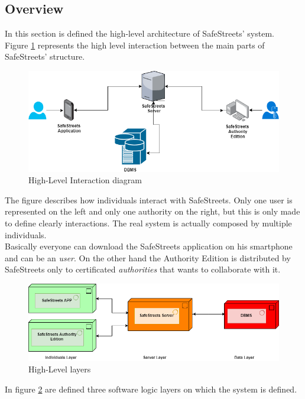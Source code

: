 \documentclass{article}
\begin{document}
		\subsection{Overview}
		In this section is defined the high-level architecture of SafeStreets' system. \\ 
		Figure \ref{fig:hinteraction_diagram} represents the high level interaction between the main parts of SafeStreets' structure.
		\begin{figure}[H]
			\includegraphics [scale=0.5] {diagrams/high-interaction.png}
			\caption[High-Level Interaction]{High-Level Interaction diagram}
			\label{fig:hinteraction_diagram}
		\end{figure}
		The figure describes how individuals interact with SafeStreets. Only one user is represented on the left and only one authority on the right, but this is only made to define clearly interactions. The real system is actually composed by multiple individuals.\\
		Basically everyone can download the SafeStreets application on his smartphone and can be an \textit{user}. On the other hand the Authority Edition is distributed by SafeStreets only to certificated \textit{authorities} that wants to collaborate with it. 
		\begin{figure}[H]
			\includegraphics [scale=0.5] {diagrams/High-level.png}
			\caption[High-Level Layers]{High-Level layers}
			\label{fig:hlayers}
		\end{figure}
		In figure \ref{fig:hlayers}	are defined three software logic layers on which the system is defined. \\
\end{document}
